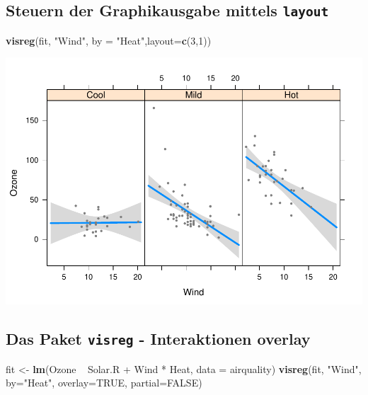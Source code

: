 \documentclass[]{article}
\newenvironment{Shaded}{\begin{snugshade}}{\end{snugshade}}
\newcommand{\KeywordTok}[1]{\textcolor[rgb]{0.13,0.29,0.53}{\textbf{{#1}}}}
\newcommand{\DataTypeTok}[1]{\textcolor[rgb]{0.13,0.29,0.53}{{#1}}}
\newcommand{\DecValTok}[1]{\textcolor[rgb]{0.00,0.00,0.81}{{#1}}}
\newcommand{\StringTok}[1]{\textcolor[rgb]{0.31,0.60,0.02}{{#1}}}
\newcommand{\OtherTok}[1]{\textcolor[rgb]{0.56,0.35,0.01}{{#1}}}
\newcommand{\NormalTok}[1]{{#1}}
\begin{document}
\subsection{\texorpdfstring{Steuern der Graphikausgabe mittels
\texttt{layout}}{Steuern der Graphikausgabe mittels layout}}\label{steuern-der-graphikausgabe-mittels-layout}

\begin{Shaded}
\begin{Highlighting}[]
\KeywordTok{visreg}\NormalTok{(fit, }\StringTok{"Wind"}\NormalTok{, }\DataTypeTok{by =} \StringTok{"Heat"}\NormalTok{,}\DataTypeTok{layout=}\KeywordTok{c}\NormalTok{(}\DecValTok{3}\NormalTok{,}\DecValTok{1}\NormalTok{))}
\end{Highlighting}
\end{Shaded}

\includegraphics{Intro_Datenanalyse1_files/figure-latex/unnamed-chunk-285-1.pdf}

\subsection{\texorpdfstring{Das Paket \texttt{visreg} - Interaktionen
overlay}{Das Paket visreg - Interaktionen overlay}}\label{das-paket-visreg---interaktionen-overlay}

\begin{Shaded}
\begin{Highlighting}[]
\NormalTok{fit <-}\StringTok{ }\KeywordTok{lm}\NormalTok{(Ozone ~}\StringTok{ }\NormalTok{Solar.R +}\StringTok{ }\NormalTok{Wind *}\StringTok{ }\NormalTok{Heat, }\DataTypeTok{data =} \NormalTok{airquality)}
\KeywordTok{visreg}\NormalTok{(fit, }\StringTok{"Wind"}\NormalTok{, }\DataTypeTok{by=}\StringTok{"Heat"}\NormalTok{, }\DataTypeTok{overlay=}\OtherTok{TRUE}\NormalTok{, }\DataTypeTok{partial=}\OtherTok{FALSE}\NormalTok{)}
\end{Highlighting}
\end{Shaded}
\end{document}
